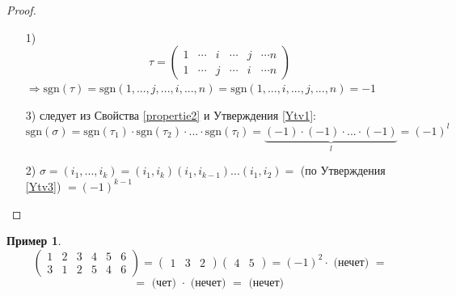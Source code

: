 \documentclass[a4paper, 12pt]{article}
\newcommand\tab[1][.5cm]{\hspace*{#1}}
\theoremstyle{definition}
\newtheorem*{example1}{Пример}
\begin{document}
  \begin{proof}\tab
    \begin{itemize}
      \item[1)] $$\tau = \begin{pmatrix}
        1 & \cdots & i & \cdots & j & \cdots n \\
        1 & \cdots & j & \cdots & i & \cdots n
      \end{pmatrix} $$$  \Longrightarrow \textrm{sgn} (\tau) = \textrm{sgn}(1,...,j,...,i,...,n) = \textrm{sgn}(1,...,i,...,j,...,n) = -1$  
      \item[3)] следует из Свойства \eqref{propertie2} и Утверждения \eqref{Ytv1}:
      $$\textrm{sgn}(\sigma) = \textrm{sgn}(\tau_1) \cdot \textrm{sgn}(\tau_2) \cdot ... \cdot \textrm{sgn}(\tau_l) = \underbrace{(-1)\cdot(-1)\cdot ... \cdot(-1)}_{l} = (-1)^{l}$$ 
      \item[2)] $\sigma = (i_1,...,i_k) = (i_1,i_k)(i_1,i_{k-1})...(i_1,i_2) =$ (по Утверждения \eqref{Ytv3}) $= (-1)^{k-1}$ 
    \end{itemize}
  \end{proof}
  \begin{example1}
    $$\begin{pmatrix}
      1 & 2 & 3 & 4 & 5 & 6 \\
      3 & 1 & 2 & 5 & 4 & 6
    \end{pmatrix} = \begin{pmatrix}
      1 & 3 & 2
    \end{pmatrix} \begin{pmatrix}
      4 & 5 
    \end{pmatrix} = (-1)^2 \cdot \text{ (нечет) }=$$
    $$ = \text{ (чет) }\cdot \text{ (нечет) } = \text{ (нечет) }$$
  \end{example1}
\end{document}
